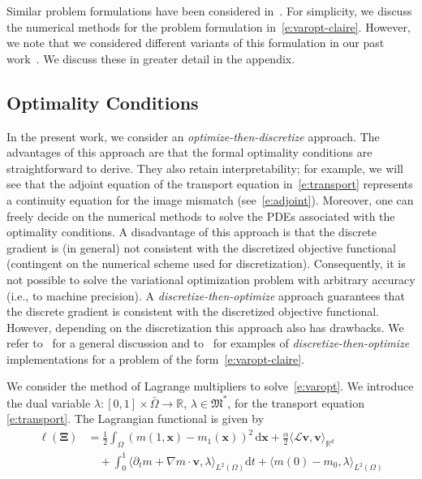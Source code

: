 \documentclass[11pt]{amsart}
\newcommand\fs[1]{\ensuremath{\mathfrak{#1}}}
\newcommand\op[1]{\ensuremath{\mathcal{#1}}}
\newcommand\igrad{\ensuremath{\nabla}}
\renewcommand{\d}{\ensuremath{\text{d}}}
\renewcommand{\vec}[1]{\ensuremath{\boldsymbol{#1}}}
\newcommand\dual{\ensuremath{\ast}}
\begin{document}
\noindent Similar problem formulations have been considered in~\cite{Borzi:2002a,Borzi:2002b,Chen:2012a,Hart:2009a}. For simplicity, we discuss the numerical methods for the problem formulation in~\eqref{e:varopt-claire}. However, we note that we considered different variants of this formulation in our past work~\cite{Mang:2015a,Mang:2016a,Mang:2019a,Brunn:2020a}. We discuss these in greater detail in the appendix.




\subsection{Optimality Conditions}\label{s:optcond}

In the present work, we consider an \emph{optimize-then-discretize} approach. The advantages of this approach are that the formal optimality conditions are straightforward to derive. They also retain interpretability; for example, we will see that the adjoint equation of the transport equation in~\eqref{e:transport} represents a continuity equation for the image mismatch (see~\eqref{e:adjoint}). Moreover, one can freely decide on the numerical methods to solve the PDEs associated with the optimality conditions. A disadvantage of this approach is that the discrete gradient is (in general) not consistent with the discretized objective functional (contingent on the numerical scheme used for discretization). Consequently, it is not possible to solve the variational optimization problem with arbitrary accuracy (i.e., to machine precision). A \emph{discretize-then-optimize} approach guarantees that the discrete gradient is consistent with the discretized objective functional. However, depending on the discretization this approach also has drawbacks. We refer to~\cite{Gunzburger:2003a} for a general discussion and to~\cite{Mang:2017a,Polzin:2020a} for examples of \emph{discretize-then-optimize} implementations for a problem of the form~\eqref{e:varopt-claire}.

We consider the method of Lagrange multipliers to solve~\eqref{e:varopt}. We introduce the dual variable $\lambda : [0,1] \times \bar{\Omega} \to \mathbb{R}$, $\lambda \in \fs{M}^\dual$, for the transport equation \eqref{e:transport}. The Lagrangian functional is given by
\begin{equation}\label{e:lagrangian}
\begin{aligned}
\ell(\vec{\Xi}) & =
\frac{1}{2}\int_{\Omega} ( m(1,\vec{x}) - m_1(\vec{x}) )^2 \, \d \vec{x}
+ \frac{\alpha}{2} \langle\op{L}\vec{v},\vec{v}\rangle_{\mathbb{R}^d}
\\
& \quad
+ \int_0^1\langle\partial_t m  + \igrad m \cdot \vec{v}, \lambda \rangle_{L^2(\Omega)} \d t
+ \langle m(0) - m_0, \lambda \rangle_{L^2(\Omega)}
\end{aligned}
\end{equation}
\end{document}
